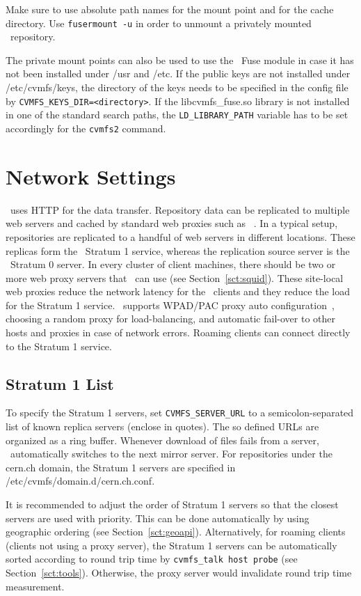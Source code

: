 Make sure to use absolute path names for the mount point and for the cache directory.
Use \texttt{fusermount -u} in order to unmount a privately mounted \cvmfs\ repository.

The private mount points can also be used to use the \cvmfs\ Fuse module in case it has not been installed under /usr and /etc.
If the public keys are not installed under /etc/cvmfs/keys, the directory of the keys needs to be specified in the config file by \texttt{CVMFS\_KEYS\_DIR=<directory>}.
If the libcvmfs\_fuse.so library is not installed in one of the standard search paths, the \texttt{LD\_LIBRARY\_PATH} variable has to be set accordingly for the \texttt{cvmfs2} command.

\section{Network Settings}
\label{sct:config:network}
\cvmfs\ uses HTTP for the data transfer.
Repository data can be replicated to multiple web servers and cached by standard web proxies such as \squid~\cite{squid99}.
In a typical setup, repositories are replicated to a handful of web servers in different locations.
These replicas form the \cvmfs\ Stratum 1 service, whereas the replication source server is the \cvmfs\ Stratum 0 server.
In every cluster of client machines, there should be two or more web proxy servers that \cvmfs\ can use (see Section~\ref{sct:squid}).
These site-local web proxies reduce the network latency for the \cvmfs\ clients and they reduce the load for the Stratum 1 service.
\cvmfs\ supports WPAD/PAC proxy auto configuration~\cite{wpad99}, choosing a random proxy for load-balancing, and automatic fail-over to other hosts and proxies in case of network errors.
Roaming clients can connect directly to the Stratum 1 service.

\subsection{Stratum 1 List}
To specify the Stratum 1 servers, set \texttt{CVMFS\_SERVER\_URL} to a semicolon-separated list of known replica servers (enclose in quotes). 
The so defined URLs are organized as a ring buffer.
Whenever download of files fails from a server, \cvmfs\ automatically switches to the next mirror server.
For repositories under the cern.ch domain, the Stratum 1 servers are specified in /etc/cvmfs/domain.d/cern.ch.conf.

It is recommended to adjust the order of Stratum 1 servers so that
the closest servers are used with priority.  This can be done
automatically by using geographic ordering (see Section~\ref{sct:geoapi}).
Alternatively, for roaming clients (\ie clients not using a proxy server),
the Stratum 1 servers can be automatically sorted according to round trip
time by \texttt{cvmfs\_talk host probe} (see Section~\ref{sct:tools}).
Otherwise, the proxy server would invalidate round trip time measurement.

